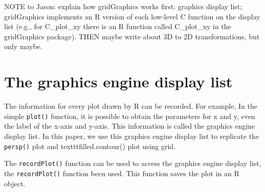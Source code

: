 \documentclass[a4paper,10pt]{article}\usepackage[]{graphicx}\usepackage[]{color}
\begin{document}
NOTE to Jason: explain how gridGraphics works first: graphics display list; gridGraphics implements an R version of each low-level C function on the display list (e.g., for C\_plot\_xy there is an R function called C\_plot\_xy in the gridGraphics package). THEN maybe write about 3D to 2D transformations, but only maybe.


\section{The graphics engine display list}
The information for every plot drawn by R can be recorded. For example, In the simple \texttt{plot()} function, it is possible to obtain the parameters for x and y, even the label of the x-axis and y-axis.
This information is called the graphics engine display list. In this paper, we use this graphics engine display list to replicate the \texttt{persp()} plot and texttt{filled.contour()} plot using grid.

The \texttt{recordPlot()} function can be used to access the graphics engine display list, the \texttt{recordPlot()} function been used. This function saves the plot in an R object. 
\end{document}
